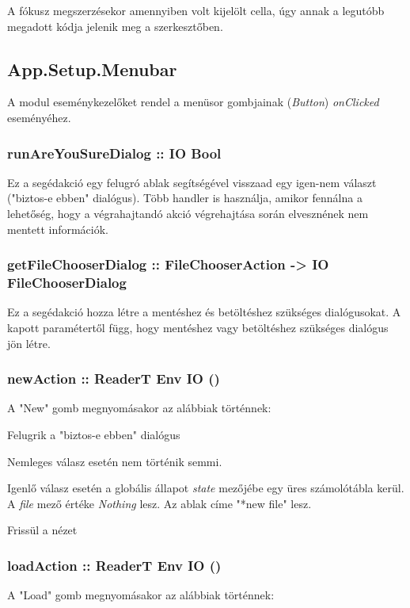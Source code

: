 A fókusz megszerzésekor amennyiben volt kijelölt cella, úgy annak a legutóbb megadott kódja jelenik meg a szerkesztőben.

\subsection{App.Setup.Menubar}

A modul eseménykezelőket rendel a menüsor gombjainak (\textit{Button}) \textit{onClicked} eseményéhez.

\subsubsection{runAreYouSureDialog :: IO Bool}

Ez a segédakció egy felugró ablak segítségével visszaad egy igen-nem választ ("biztos-e ebben" dialógus). Több handler is használja, amikor fennálna a lehetőség, hogy a végrahajtandó akció végrehajtása során elvesznének nem mentett információk.

\subsubsection{getFileChooserDialog :: FileChooserAction -> IO FileChooserDialog}

Ez a segédakció hozza létre a mentéshez és betöltéshez szükséges dialógusokat. A kapott paramétertől függ, hogy mentéshez vagy betöltéshez szükséges dialógus jön létre.

\subsubsection{newAction :: ReaderT Env IO ()}

A "New" gomb megnyomásakor az alábbiak történnek:
\begin{compactenum}
	\item Felugrik a "biztos-e ebben" dialógus
	\item Nemleges válasz esetén nem történik semmi.
	\item Igenlő válasz esetén a globális állapot \textit{state} mezőjébe egy üres számolótábla kerül. A \textit{file} mező értéke \textit{Nothing} lesz. Az ablak címe "*new file" lesz.
	\item Frissül a nézet
\end{compactenum}

\subsubsection{loadAction :: ReaderT Env IO ()}

A "Load" gomb megnyomásakor az alábbiak történnek:
\begin{compactenum}
	\item 
\end{compactenum}
